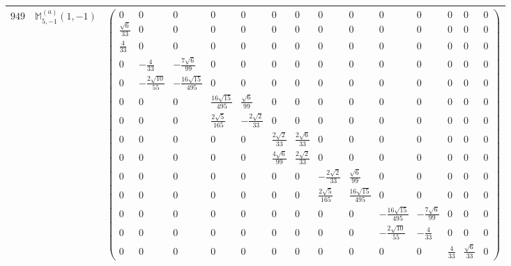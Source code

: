 \documentclass[fleqn,8pt,landscape]{jsarticle}
\begin{document}
\begin{center}
\begin{longtable}{ccc}
$ 949 $ & $ \mathbb{M}_{5,-1}^{(a)}(1,-1) $ & $ \begin{pmatrix} 0 & 0 & 0 & 0 & 0 & 0 & 0 & 0 & 0 & 0 & 0 & 0 & 0 & 0 \\ \frac{\sqrt{6}}{33} & 0 & 0 & 0 & 0 & 0 & 0 & 0 & 0 & 0 & 0 & 0 & 0 & 0 \\ \frac{4}{33} & 0 & 0 & 0 & 0 & 0 & 0 & 0 & 0 & 0 & 0 & 0 & 0 & 0 \\ 0 & - \frac{4}{33} & - \frac{7 \sqrt{6}}{99} & 0 & 0 & 0 & 0 & 0 & 0 & 0 & 0 & 0 & 0 & 0 \\ 0 & - \frac{2 \sqrt{10}}{55} & - \frac{16 \sqrt{15}}{495} & 0 & 0 & 0 & 0 & 0 & 0 & 0 & 0 & 0 & 0 & 0 \\ 0 & 0 & 0 & \frac{16 \sqrt{15}}{495} & \frac{\sqrt{6}}{99} & 0 & 0 & 0 & 0 & 0 & 0 & 0 & 0 & 0 \\ 0 & 0 & 0 & \frac{2 \sqrt{5}}{165} & - \frac{2 \sqrt{2}}{33} & 0 & 0 & 0 & 0 & 0 & 0 & 0 & 0 & 0 \\ 0 & 0 & 0 & 0 & 0 & \frac{2 \sqrt{2}}{33} & \frac{2 \sqrt{6}}{33} & 0 & 0 & 0 & 0 & 0 & 0 & 0 \\ 0 & 0 & 0 & 0 & 0 & \frac{4 \sqrt{6}}{99} & \frac{2 \sqrt{2}}{33} & 0 & 0 & 0 & 0 & 0 & 0 & 0 \\ 0 & 0 & 0 & 0 & 0 & 0 & 0 & - \frac{2 \sqrt{2}}{33} & \frac{\sqrt{6}}{99} & 0 & 0 & 0 & 0 & 0 \\ 0 & 0 & 0 & 0 & 0 & 0 & 0 & \frac{2 \sqrt{5}}{165} & \frac{16 \sqrt{15}}{495} & 0 & 0 & 0 & 0 & 0 \\ 0 & 0 & 0 & 0 & 0 & 0 & 0 & 0 & 0 & - \frac{16 \sqrt{15}}{495} & - \frac{7 \sqrt{6}}{99} & 0 & 0 & 0 \\ 0 & 0 & 0 & 0 & 0 & 0 & 0 & 0 & 0 & - \frac{2 \sqrt{10}}{55} & - \frac{4}{33} & 0 & 0 & 0 \\ 0 & 0 & 0 & 0 & 0 & 0 & 0 & 0 & 0 & 0 & 0 & \frac{4}{33} & \frac{\sqrt{6}}{33} & 0 \end{pmatrix} $ \\ \hline

\end{longtable}
\end{center}
\end{document}
